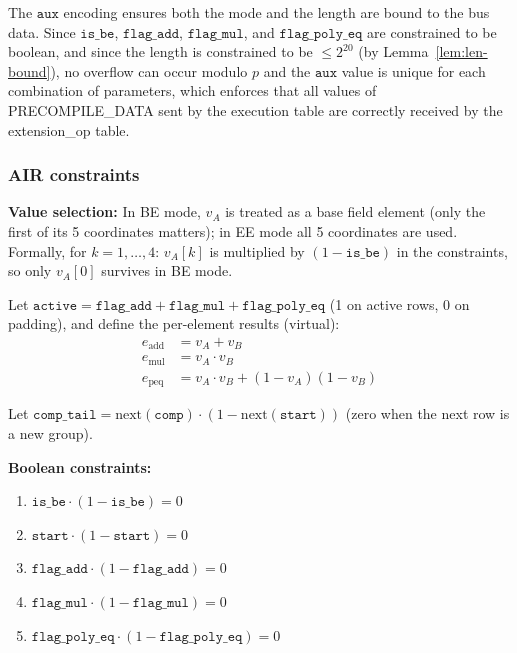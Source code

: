 \documentclass{article}
\theoremstyle{definition}
\begin{document}
The $\texttt{aux}$ encoding ensures both the mode and the length are bound to the bus data. Since $\texttt{is\_be}$, $\texttt{flag\_add}$, $\texttt{flag\_mul}$, and $\texttt{flag\_poly\_eq}$ are constrained to be boolean, and since the length is constrained to be $\leq 2^{20}$ (by Lemma~\ref{lem:len-bound}), no overflow can occur modulo $p$ and the $\texttt{aux}$ value is unique for each combination of parameters, which enforces that all values of PRECOMPILE\_DATA sent by the execution table are correctly received by the extension\_op table.


\subsubsection{AIR constraints}


\vspace{2mm}

\textbf{Value selection:} In BE mode, $v_A$ is treated as a base field element (only the first of its 5 coordinates matters); in EE mode all 5 coordinates are used. Formally, for $k = 1, \dots, 4$: $v_A[k]$ is multiplied by $(1 - \texttt{is\_be})$ in the constraints, so only $v_A[0]$ survives in BE mode.

Let $\texttt{active} = \texttt{flag\_add} + \texttt{flag\_mul} + \texttt{flag\_poly\_eq}$ (1 on active rows, 0 on padding), and define the per-element results (virtual):
\begin{align*}
    e_\text{add} &= v_A + v_B \\
    e_\text{mul} &= v_A \cdot v_B \\
    e_\text{peq} &= v_A \cdot v_B + (1 - v_A)(1 - v_B)
\end{align*}

Let $\texttt{comp\_tail} = \text{next}(\texttt{comp}) \cdot (1 - \text{next}(\texttt{start}))$ (zero when the next row is a new group).

\vspace{2mm}

\textbf{Boolean constraints:}
\begin{enumerate}
    \item $\texttt{is\_be} \cdot (1 - \texttt{is\_be}) = 0$
    \item $\texttt{start} \cdot (1 - \texttt{start}) = 0$
    \item $\texttt{flag\_add} \cdot (1 - \texttt{flag\_add}) = 0$
    \item $\texttt{flag\_mul} \cdot (1 - \texttt{flag\_mul}) = 0$
    \item $\texttt{flag\_poly\_eq} \cdot (1 - \texttt{flag\_poly\_eq}) = 0$
\end{enumerate}
\end{document}
